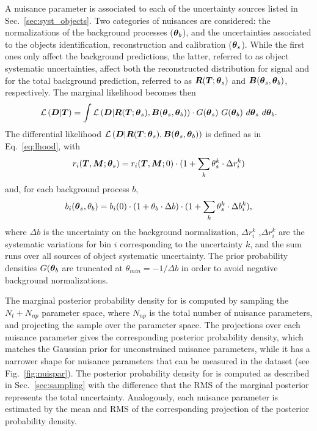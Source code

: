 A nuisance parameter is associated to each of the uncertainty sources
listed in Sec.~\ref{sec:syst_objects}. Two categories of nuisances
are considered: the normalizations of the background processes
($\boldsymbol{\theta}{}_b$), and the uncertainties associated to the objects
identification, reconstruction and calibration ($\boldsymbol{\theta}{}_s$).
While the first ones only affect the background predictions, the
latter, referred to as object systematic uncertainties, affect both the
reconstructed distribution for \ttbar{} signal and for
the total background prediction, referred to as
$\boldsymbol{R}{}(\boldsymbol{T}{};\boldsymbol{\theta}{}_s)$ and
$\boldsymbol{B}{}(\boldsymbol{\theta}{}_s,\boldsymbol{\theta}{}_b)$, respectively.
The marginal likelihood becomes then
\begin{equation}
\label{eq:marginalLhood}
  \mathcal{L}\left(\boldsymbol{D}{}|\boldsymbol{T}{}\right)=
  \int
  \mathcal{L}\left(\boldsymbol{D}{}|\boldsymbol{R}{}(\boldsymbol{T}{};\boldsymbol{\theta}{}_s),\boldsymbol{B}{}(\boldsymbol{\theta}{}_s,\boldsymbol{\theta}{}_b)\right) 
  \cdot{} G(\boldsymbol{\theta}{}_s) ~G(\boldsymbol{\theta}{}_b)
  ~d\boldsymbol{\theta}{}_s ~d\boldsymbol{\theta}{}_b.
\end{equation}
The differential likelihood
$\mathcal{L}\left(\boldsymbol{D}{}|\boldsymbol{R}{}(\boldsymbol{T}{};\boldsymbol{\theta}{}_s),\boldsymbol{B}{}(\boldsymbol{\theta}{}_s,\boldsymbol{\theta}{}_b)\right)$
is defined as in Eq.~\ref{eq:lhood}, with 
\begin{equation}
r_i(\boldsymbol{T}{},\boldsymbol{M}{};\boldsymbol{\theta}{}_s) =
r_i(\boldsymbol{T}{},\boldsymbol{M}{};0) \cdot ( 1 + \sum_k
\theta_s^k\cdot\Delta r_i^k )
\end{equation}
and, for each background process $b$,
\begin{equation}
b_i(\boldsymbol{\theta}{}_s,\theta_b) =
b_i(0) \cdot ( 1 + \theta_b\cdot\Delta b) \cdot
(1 + \sum_k \theta_s^k\cdot\Delta b_i^k ),
\end{equation}
where $\Delta b$ is the uncertainty on the background normalization,
$\Delta r_i^k$ ,$\Delta r_i^k$ are the systematic variations for
bin $i$ corresponding to the uncertainty $k$, and the sum runs over
all sources of object systematic uncertainty.
The prior probability densities $G(\boldsymbol{\theta}{}_b$ are truncated at
$\theta_{min}=-1/\Delta b$ in order to avoid negative background
normalizations. 

The marginal posterior probability density for \Truth{} is computed by
sampling the $N_t+N_{np}$ parameter space, where $N_{np}$ is the
total number of nuisance parameters, and projecting the sample over
the \Truth{} parameter space. The projections over each nuisance
parameter gives the corresponding posterior probability density,
which matches the Gaussian prior for unconstrained nuisance
parameters, while it has a narrower shape for nuisance parameters
that can be measured in the dataset (see Fig.~\ref{fig:nuispar}).
The posterior probability density for \ac{} is computed as described in
Sec.~\ref{sec:sampling} with the difference that the RMS of the
marginal posterior represents the total uncertainty. Analogously, each
nuisance parameter is estimated by the mean and RMS of the
corresponding projection of the posterior probability density.

